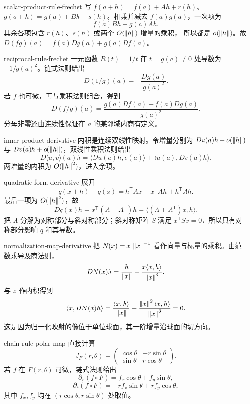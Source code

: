 \begin{solution}{scalar-product-rule-frechet}
写
\(f(a+h)=f(a)+Ah+r(h)\)、
\(g(a+h)=g(a)+Bh+s(h)\)。相乘并减去
\(f(a)g(a)\)，一次项为
\[
 f(a)Bh+g(a)Ah.
\]
其余各项包含 \(r(h)\)、\(s(h)\) 或两个 \(O(\left\lVert h\right\rVert)\) 增量的乘积，
所以都是 \(o(\left\lVert h\right\rVert)\)。故
\(D(fg)(a)=f(a)Dg(a)+g(a)Df(a)\)。
\end{solution}

\begin{solution}{reciprocal-rule-frechet}
一元函数 \(R(t)=1/t\) 在 \(t=g(a)\ne0\) 处导数为
\(-1/g(a)^2\)。链式法则给出
\[
 D(1/g)(a)=-\frac{Dg(a)}{g(a)^2}.
\]
若 \(f\) 也可微，再与乘积法则组合，得到
\[
 D(f/g)(a)=\frac{g(a)Df(a)-f(a)Dg(a)}{g(a)^2}.
\]
分母非零还由连续性保证在 \(a\) 的某邻域内商有定义。
\end{solution}

\begin{solution}{inner-product-derivative}
内积是连续双线性映射。令增量分别为
\(Du(a)h+o(\left\lVert h\right\rVert)\) 与 \(Dv(a)h+o(\left\lVert h\right\rVert)\)，双线性乘积法则给出
\[
 D\langle u,v\rangle(a)h
 =\langle Du(a)h,v(a)\rangle
  +\langle u(a),Dv(a)h\rangle.
\]
两增量的内积为 \(O(\left\lVert h\right\rVert^2)\)，进入余项。
\end{solution}

\begin{solution}{quadratic-form-derivative}
展开
\[
 q(x+h)-q(x)
 =h^{\mathsf T}Ax+x^{\mathsf T}Ah+h^{\mathsf T}Ah.
\]
最后一项为 \(O(\left\lVert h\right\rVert^2)\)，故
\[
 Dq(x)h=x^{\mathsf T}(A+A^{\mathsf T})h
 =\langle(A+A^{\mathsf T})x,h\rangle.
\]
把 \(A\) 分解为对称部分与斜对称部分；斜对称矩阵 \(S\) 满足
\(x^{\mathsf T}Sx=0\)，所以只有对称部分影响 \(q\) 和其导数。
\end{solution}

\begin{solution}{normalization-map-derivative}
把 \(N(x)=x\,\left\lVert x\right\rVert^{-1}\) 看作向量与标量的乘积。由范数求导及商法则，
\[
 DN(x)h
 =\frac h{\left\lVert x\right\rVert}
  -\frac{x\langle x,h\rangle}{\left\lVert x\right\rVert^3}.
\]
与 \(x\) 作内积得到
\[
 \langle x,DN(x)h\rangle
 =\frac{\langle x,h\rangle}{\left\lVert x\right\rVert}
  -\frac{\left\lVert x\right\rVert^2\langle x,h\rangle}{\left\lVert x\right\rVert^3}=0.
\]
这是因为归一化映射的像位于单位球面，其一阶增量沿球面的切方向。
\end{solution}

\begin{solution}{chain-rule-polar-map}
直接计算
\[
 J_F(r,\theta)=
 \begin{pmatrix}
  \cos\theta&-r\sin\theta\\
  \sin\theta&r\cos\theta
 \end{pmatrix}.
\]
若 \(f\) 在 \(F(r,\theta)\) 可微，链式法则给出
\[
 \partial_r(f\circ F)
 =f_x\cos\theta+f_y\sin\theta,
\]
\[
 \partial_\theta(f\circ F)
 =-r f_x\sin\theta+r f_y\cos\theta,
\]
其中 \(f_x,f_y\) 均在 \((r\cos\theta,r\sin\theta)\) 处取值。
\end{solution}

